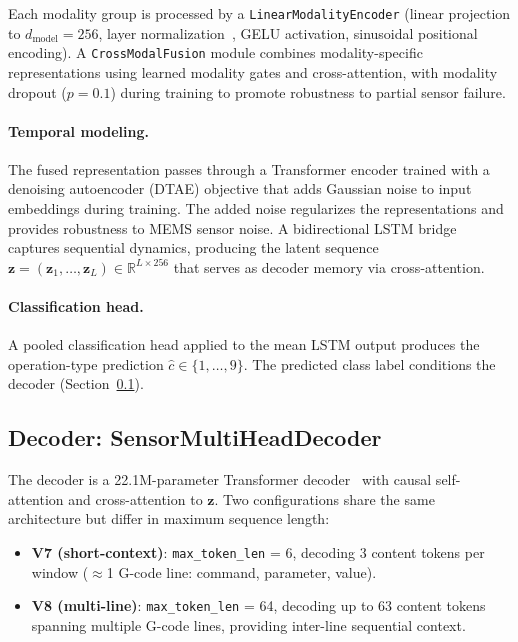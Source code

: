 Each modality group is processed by a \texttt{LinearModalityEncoder} (linear projection to $d_{\text{model}} = 256$, layer normalization~\cite{ba2016layer}, GELU activation, sinusoidal positional encoding).
A \texttt{CrossModalFusion} module combines modality-specific representations using learned modality gates and cross-attention, with modality dropout ($p = 0.1$) during training to promote robustness to partial sensor failure.

\paragraph{Temporal modeling.}
The fused representation passes through a Transformer encoder trained with a denoising autoencoder (DTAE) objective that adds Gaussian noise to input embeddings during training.
The added noise regularizes the representations and provides robustness to MEMS sensor noise.
A bidirectional LSTM bridge captures sequential dynamics, producing the latent sequence $\mathbf{z} = (\mathbf{z}_1, \ldots, \mathbf{z}_L) \in \mathbb{R}^{L \times 256}$ that serves as decoder memory via cross-attention.

\paragraph{Classification head.}
A pooled classification head applied to the mean LSTM output produces the operation-type prediction $\hat{c} \in \{1, \ldots, 9\}$.
The predicted class label conditions the decoder (Section~\ref{sec:decoder}).

\subsection{Decoder: SensorMultiHeadDecoder}
\label{sec:decoder}

The decoder is a 22.1M-parameter Transformer decoder~\cite{vaswani2017attention} with causal self-attention and cross-attention to $\mathbf{z}$.
Two configurations share the same architecture but differ in maximum sequence length:

\begin{itemize}
    \item \textbf{V7 (short-context)}: \texttt{max\_token\_len} = 6, decoding 3 content tokens per window ($\approx$1 G-code line: command, parameter, value).
    \item \textbf{V8 (multi-line)}: \texttt{max\_token\_len} = 64, decoding up to 63 content tokens spanning multiple G-code lines, providing inter-line sequential context.
\end{itemize}

